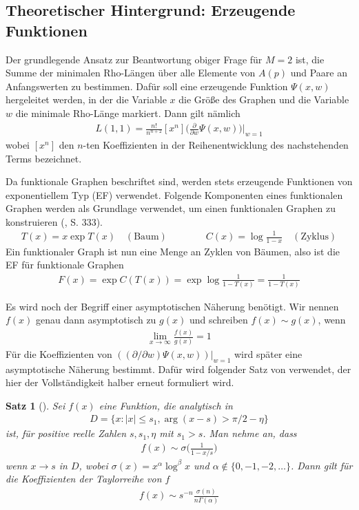 \documentclass[a4paper, 10pt, ngerman]{article}
\newtheorem{theorem}{Satz}
\begin{document}
\subsection{Theoretischer Hintergrund: Erzeugende Funktionen}

Der grundlegende Ansatz zur Beantwortung obiger Frage für $M = 2$ ist, die Summe der minimalen Rho-Längen über alle Elemente von $A(p)$ und Paare an Anfangswerten zu bestimmen. Dafür soll eine erzeugende Funktion $\Psi(x, w)$ hergeleitet werden, in der die Variable $x$ die Größe des Graphen und die Variable $w$ die minimale Rho-Länge markiert. Dann gilt nämlich
\begin{align*}
    L(1, 1) = \frac {n!}{n^{n + 2}} [x^n] \Bigg (\frac {\partial} {\partial w} \Psi(x, w) \Bigg ) \Bigg \vert_{w = 1}
\end{align*}
wobei $[x^n]$ den $n$-ten Koeffizienten in der Reihenentwicklung des nachstehenden Terms bezeichnet.

Da funktionale Graphen beschriftet sind, werden stets erzeugende Funktionen von exponentiellem Typ (EF) verwendet. Folgende Komponenten eines funktionalen Graphen werden als Grundlage verwendet, um einen funktionalen Graphen zu konstruieren (\cite{fo90}, S. 333).
\begin{align*}
    T(x) = x \exp T(x) \quad (\text{Baum}) \qquad\qquad C(x) = \log \frac {1} {1 - x} \quad (\text{Zyklus})
\end{align*}
Ein funktionaler Graph ist nun eine Menge an Zyklen von Bäumen, also ist die EF für funktionale Graphen
\begin{align*}
    F(x) = \exp C(T(x)) = \exp \log \frac 1 {1 - T(x)} = \frac 1 {1 - T(x)}
\end{align*}

Es wird noch der Begriff einer asymptotischen Näherung benötigt. Wir nennen $f(x)$ genau dann asymptotisch zu $g(x)$ und schreiben $f(x) \sim g(x)$, wenn
\begin{align*}
    \lim_{x \to \infty} \frac {f(x)} {g(x)} = 1
\end{align*}
Für die Koeffizienten von $((\partial / \partial w) \Psi(x, w)) |_{w = 1}$ wird später eine asymptotische Näherung bestimmt. Dafür wird folgender Satz von \cite{fo90} verwendet, der hier der Vollständigkeit halber erneut formuliert wird.

\begin{theorem}[\cite{fo90}]
    Sei $f(x)$ eine Funktion, die analytisch in
    \begin{align*}
        D = \{x : |x| \le s_1, \arg(x - s) > \pi/2 - \eta \}
    \end{align*}
    ist, für positive reelle Zahlen $s, s_1, \eta$ mit $s_1 > s$. Man nehme an, dass
    \begin{align*}
        f(x) \sim \sigma \bigg ( \frac 1 {1 - x/s} \bigg )
    \end{align*}
    wenn $x \to s$ in $D$, wobei $\sigma(x) = x^\alpha \log^\beta x$ und $\alpha \notin \{0, -1, -2, \dots\}$. Dann gilt für die Koeffizienten der Taylorreihe von $f$
    \begin{align*}
        [x^n]f(x) \sim s^{-n} \frac {\sigma(n)}{n\Gamma(\alpha)}
    \end{align*}
\end{theorem}
\end{document}
